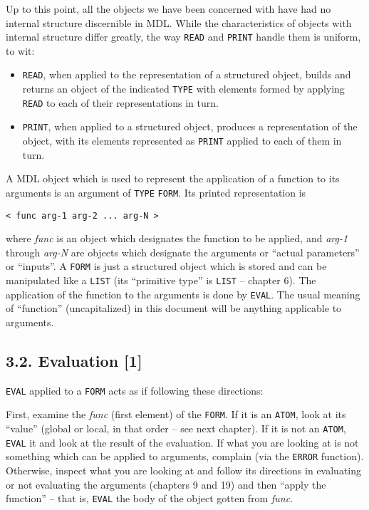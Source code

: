 \documentclass[a4paper,]{article}
\begin{document}
Up to this point, all the objects we have been concerned with have had no internal structure discernible in MDL. While the
characteristics of objects with internal structure differ greatly, the way \texttt{READ} and \texttt{PRINT} handle them is
uniform, to wit:

\begin{itemize}
\item
  \texttt{READ}, when applied to the representation of a structured object, builds and returns an object of the indicated
  \texttt{TYPE} with elements formed by applying \texttt{READ} to each of their representations in turn.
\item
  \texttt{PRINT}, when applied to a structured object, produces a representation of the object, with its elements
  represented as \texttt{PRINT} applied to each of them in turn.
\end{itemize}

A MDL object which is used to represent the application of a function to its arguments is an argument of \texttt{TYPE}
\texttt{FORM}. Its printed representation is

\begin{verbatim}
< func arg-1 arg-2 ... arg-N >
\end{verbatim}

where \emph{func} is an object which designates the function to be applied, and
\emph{arg-1} through \emph{arg-N} are objects which designate the arguments or ``actual parameters'' or ``inputs''. A
\texttt{FORM} is just a structured object which is stored and can be manipulated like a \texttt{LIST} (its ``primitive
type'' is \texttt{LIST} -- chapter 6). The application of the function to the arguments is done by \texttt{EVAL}. The usual
meaning of ``function'' (uncapitalized) in this document will be anything applicable to arguments.

\subsection{3.2. Evaluation {[}1{]}}\label{evaluation-1}

\texttt{EVAL} applied to a \texttt{FORM} acts as if following these directions:

First, examine the \emph{func} (first element) of the \texttt{FORM}. If it is an \texttt{ATOM}, look at its ``value''
(global or local, in that order -- see next chapter). If it is not an \texttt{ATOM}, \texttt{EVAL} it and look at the
result of the evaluation. If what you are looking at is not something which can be applied to arguments, complain (via the
\texttt{ERROR} function). Otherwise, inspect what you are looking at and follow its directions in evaluating or not
evaluating the arguments (chapters 9 and 19) and then ``apply the function'' -- that is, \texttt{EVAL} the body of the
object gotten from \emph{func}.
\end{document}
